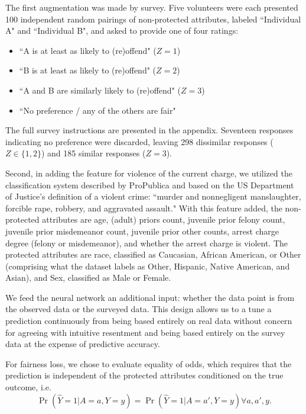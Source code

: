         The first augmentation was made by survey.  Five volunteers were each presented 100 independent random pairings of non-protected attributes, labeled ``Individual A" and ``Individual B", and asked to provide one of four ratings:
        \begin{itemize}
            \item ``A is at least as likely to (re)offend" ($Z = 1$)
            \item ``B is at least as likely to (re)offend" ($Z = 2$)
            \item ``A and B are similarly likely to (re)offend" ($Z = 3$)
            \item ``No preference / any of the others are fair"
        \end{itemize}
        The full survey instructions are presented in the appendix.  Seventeen responses indicating no preference were discarded, leaving 298 dissimilar responses ($Z \in \{1, 2\}$) and 185 similar responses ($Z = 3$).

        Second, in adding the feature for violence of the current charge, we utilized the classification system described by ProPublica and based on the US Department of Justice's definition of a violent crime: ``murder and nonnegligent manslaughter, forcible rape, robbery, and aggravated assault."  With this feature added, the non-protected attributes are age, (adult) priors count, juvenile prior felony count, juvenile prior misdemeanor count, juvenile prior other counts, arrest charge degree (felony or misdemeanor), and whether the arrest charge is violent.  The protected attributes are race, classified as Caucasian, African American, or Other (comprising what the dataset labels as Other, Hispanic, Native American, and Asian), and Sex, classified as Male or Female.
        
        We feed the neural network an additional input: whether the data point is from the observed data or the surveyed data.  This design allows us to a tune a prediction continuously from being based entirely on real data without concern for agreeing with intuitive resentment and being based entirely on the survey data at the expense of predictive accuracy.
        
        For fairness loss, we chose to evaluate equality of odds, which requires that the prediction is independent of the protected attributes conditioned on the true outcome, i.e.
        $$ \Pr(\hat{Y} = 1 | A = a, Y = y) = \Pr(\hat{Y} = 1 | A = a', Y = y) \forall a, a', y .$$
        
